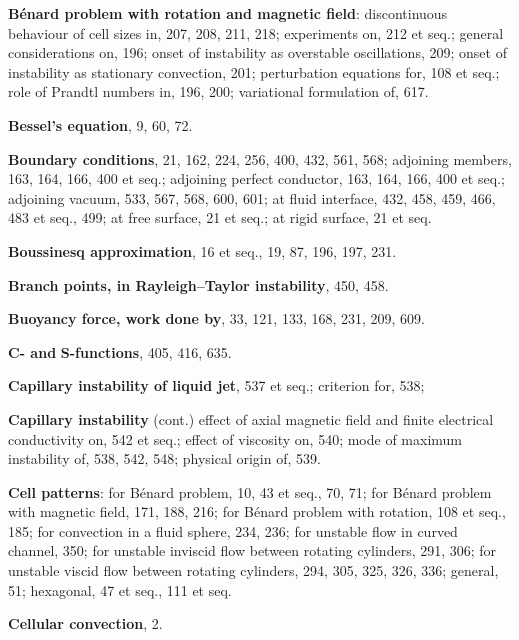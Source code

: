 \begin{small}
\medskip\noindent
\textbf{B\'enard problem with rotation and magnetic field}:
  discontinuous behaviour of cell sizes in,
    207, 208, 211, 218;
  experiments on, 212 et seq.;
  general considerations on, 196;
  onset of instability as overstable oscillations, 209;
  onset of instability as stationary convection, 201;
  perturbation equations for, 108 et seq.;
  role of Prandtl numbers in, 196, 200;
  variational formulation of, 617.

\medskip\noindent
\textbf{Bessel's equation}, 9, 60, 72.

\medskip\noindent
\textbf{Boundary conditions}, 21, 162, 224, 256,
  400, 432, 561, 568;
  adjoining members, 163, 164, 166, 400
    et seq.;
  adjoining perfect conductor, 163, 164,
    166, 400 et seq.;
  adjoining vacuum, 533, 567, 568, 600,
    601;
  at fluid interface, 432, 458, 459, 466,
    483 et seq., 499;
  at free surface, 21 et seq.;
  at rigid surface, 21 et seq.

\medskip\noindent
\textbf{Boussinesq approximation}, 16 et seq., 19,
  87, 196, 197, 231.

\medskip\noindent
\textbf{Branch points, in Rayleigh--Taylor instability}, 450, 458.

\medskip\noindent
\textbf{Buoyancy force, work done by}, 33, 121,
  133, 168, 231, 209, 609.

\bigskip\noindent
$\boldsymbol{C}$\textbf{- and} $\boldsymbol{S}$\textbf{-functions}, 405, 416, 635.

\medskip\noindent
\textbf{Capillary instability of liquid jet}, 537 et
  seq.;
  criterion for, 538;

\medskip\noindent
\textbf{Capillary instability} (cont.)
  effect of axial magnetic field and finite
  electrical conductivity on, 542 et seq.;
  effect of viscosity on, 540;
  mode of maximum instability of, 538,
    542, 548;
  physical origin of, 539.

\medskip\noindent
\textbf{Cell patterns}:
  for B\'enard problem, 10, 43 et seq., 70, 71;
  for B\'enard problem with magnetic field,
    171, 188, 216;
  for B\'enard problem with rotation, 108
    et seq., 185;
  for convection in a fluid sphere, 234,
    236;
  for unstable flow in curved channel, 350;
  for unstable inviscid flow between rotating cylinders, 291, 306;
  for unstable viscid flow between rotating
    cylinders, 294, 305, 325, 326, 336;
  general, 51;
  hexagonal, 47 et seq., 111 et seq.

\medskip\noindent
\textbf{Cellular convection}, 2.


\end{small}
